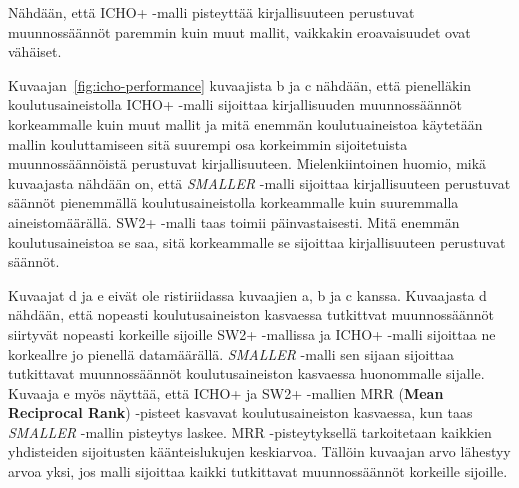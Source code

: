 \documentclass[finnish,twoside,censored,tkt,sw-line]{HYthesisML}
\begin{document}
Nähdään, että ICHO+ -malli pisteyttää kirjallisuuteen perustuvat muunnossäännöt paremmin kuin muut mallit, vaikkakin eroavaisuudet ovat vähäiset.

Kuvaajan~\ref{fig:icho-performance} kuvaajista b ja c nähdään, että pienelläkin koulutusaineistolla ICHO+ -malli sijoittaa kirjallisuuden muunnossäännöt korkeammalle kuin muut mallit ja mitä enemmän koulutuaineistoa käytetään mallin kouluttamiseen sitä suurempi osa korkeimmin sijoitetuista muunnossäännöistä perustuvat kirjallisuuteen.
Mielenkiintoinen huomio, mikä kuvaajasta nähdään on, että \emph{SMALLER} -malli sijoittaa kirjallisuuteen perustuvat säännöt pienemmällä koulutusaineistolla korkeammalle kuin suuremmalla aineistomäärällä.
SW2+ -malli taas toimii päinvastaisesti.
Mitä enemmän koulutusaineistoa se saa, sitä korkeammalle se sijoittaa kirjallisuuteen perustuvat säännöt.

Kuvaajat d ja e eivät ole ristiriidassa kuvaajien a, b ja c kanssa.
Kuvaajasta d nähdään, että nopeasti koulutusaineiston kasvaessa tutkittvat muunnossäännöt siirtyvät nopeasti korkeille sijoille SW2+ -mallissa ja ICHO+ -malli sijoittaa ne korkeallre jo pienellä datamäärällä.
\emph{SMALLER} -malli sen sijaan sijoittaa tutkittavat muunnossäännöt koulutusaineiston kasvaessa huonommalle sijalle.
Kuvaaja e myös näyttää, että ICHO+ ja SW2+ -mallien MRR (\textbf{Mean Reciprocal Rank}) -pisteet kasvavat koulutusaineiston kasvaessa, kun taas \emph{SMALLER} -mallin pisteytys laskee.
MRR -pisteytyksellä tarkoitetaan kaikkien yhdisteiden sijoitusten käänteislukujen keskiarvoa.
Tällöin kuvaajan arvo lähestyy arvoa yksi, jos malli sijoittaa kaikki tutkittavat muunnossäännöt korkeille sijoille.
\end{document}
